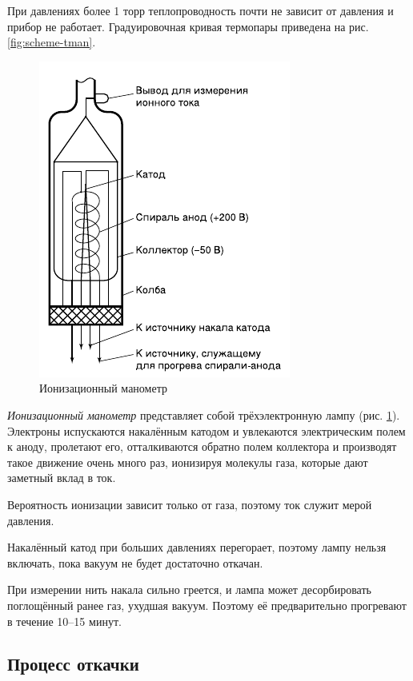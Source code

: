 \documentclass[12pt]{article}
\newcommand{\fref}[1]{рис. \ref{#1}}
\begin{document}
	При давлениях более 1 торр теплопроводность почти не зависит от давления и прибор не работает. Градуировочная кривая термопары приведена на \fref{fig:scheme-tman}.
	
	\begin{figure}[h!]
	\caption{Ионизационный манометр}
	\label{fig:scheme-iman}
	\begin{center}
	\includegraphics[scale=.6]{scheme5.png}
	\end{center}
	\end{figure}
	
	\textit{Ионизационный манометр} представляет собой трёхэлектронную лампу (\fref{fig:scheme-iman}). Электроны испускаются накалённым катодом и увлекаются электрическим полем к аноду, пролетают его, отталкиваются обратно полем коллектора и производят такое движение очень много раз, ионизируя молекулы газа, которые дают заметный вклад в ток.
	
	Вероятность ионизации зависит только от газа, поэтому ток служит мерой давления.
	
	Накалённый катод при больших давлениях перегорает, поэтому лампу нельзя включать, пока вакуум не будет достаточно откачан.
	
	При измерении нить накала сильно греется, и лампа может десорбировать поглощённый ранее газ, ухудшая вакуум. Поэтому её предварительно прогревают в течение 10--15 минут.
	
	\subsection*{Процесс откачки}
	
\end{document}
